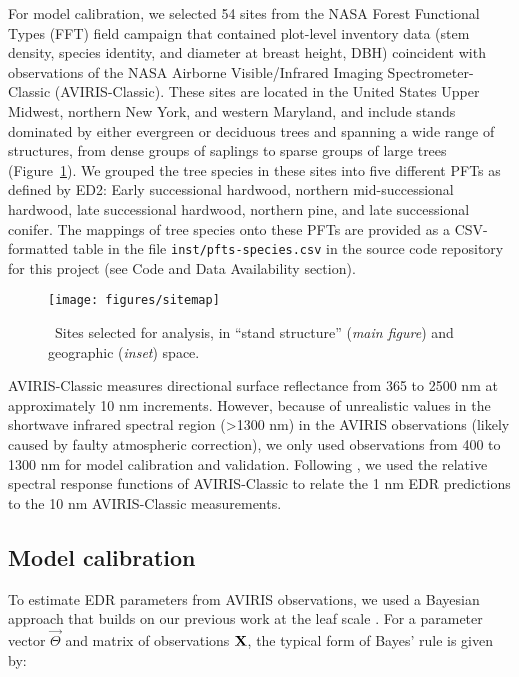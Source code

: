 For model calibration, we selected 54 sites from the NASA Forest Functional Types (FFT) field campaign that contained plot-level inventory data (stem density, species identity, and diameter at breast height, DBH) coincident with observations of the NASA Airborne Visible/Infrared Imaging Spectrometer-Classic (AVIRIS-Classic).
These sites are located in the United States Upper Midwest, northern New York, and western Maryland, and include stands dominated by either evergreen or deciduous trees and spanning a wide range of structures, from dense groups of saplings to sparse groups of large trees (Figure~\ref{fig:sites}).
We grouped the tree species in these sites into five different PFTs as defined by ED2:
Early successional hardwood, northern mid-successional hardwood, late successional hardwood, northern pine, and late successional conifer.
The mappings of tree species onto these PFTs are provided as a CSV-formatted table in the file \texttt{inst/pfts-species.csv} in the source code repository for this project (see Code and Data Availability section).

\begin{figure}
  \centering
  \texttt{[image: figures/sitemap]}
  \caption{\
    Sites selected for analysis, in ``stand structure'' (\textit{main figure}) and geographic (\textit{inset}) space.
  }\label{fig:sites}
\end{figure}

AVIRIS-Classic measures directional surface reflectance from 365 to 2500 \unit{nm} at approximately 10 \unit{nm} increments.
However, because of unrealistic values in the shortwave infrared spectral region (>1300 \unit{nm}) in the AVIRIS observations (likely caused by faulty atmospheric correction), we only used observations from 400 to 1300 \unit{nm} for model calibration and validation.
Following \citet{shiklomanov2016quantifying}, we used the relative spectral response functions of AVIRIS-Classic to relate the 1 \unit{nm} EDR predictions to the 10 \unit{nm} AVIRIS-Classic measurements.

\subsection{Model calibration}

To estimate EDR parameters from AVIRIS observations, we used a Bayesian approach that builds on our previous work at the leaf scale \citep{shiklomanov2016quantifying}.
For a parameter vector $\vec{\Theta}$ and matrix of observations $\mathbf{X}$, the typical form of Bayes' rule is given by:


